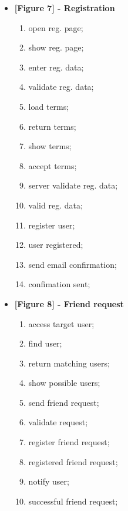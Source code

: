 \documentclass{article}
\begin{document}
			\begin{itemize}
				\item \textbf{[Figure 7] - Registration}
				\begin{enumerate}
					\item open reg. page;
					\item show reg. page;
					\item enter reg. data;
					\item validate reg. data;
					\item load terms;
					\item return terms;
					\item show terms;
					\item accept terms;
					\item server validate reg. data;
					\item valid reg. data;
					\item register user;
					\item user registered;
					\item send email confirmation;
					\item confimation sent;
				\end{enumerate}

				\item \textbf{[Figure 8] - Friend request}
				\begin{enumerate}
					\item access target user;
					\item find user;
					\item return matching users;
					\item show possible users;
					\item send friend request;
					\item validate request;
					\item register friend request;
					\item registered friend request;
					\item notify user;
					\item successful friend request;
				\end{enumerate}


\end{itemize}
\end{document}
